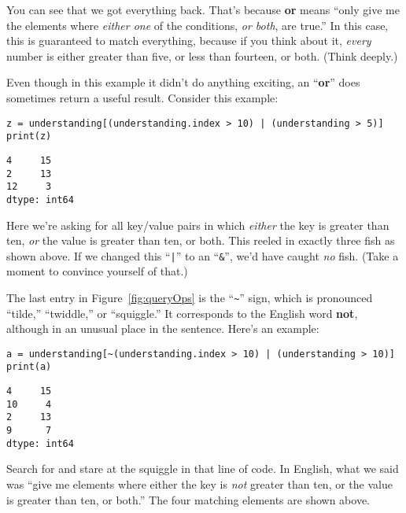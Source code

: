 You can see that we got everything back. That's because \textbf{or} means
``only give me the elements where \textit{either one} of the conditions,
\textit{or both}, are true.'' In this case, this is guaranteed to match
everything, because if you think about it, \textit{every} number is either
greater than five, or less than fourteen, or both. (Think deeply.)

Even though in this example it didn't do anything exciting, an ``\textbf{or}''
does sometimes return a useful result. Consider this example:

\begin{Verbatim}[fontsize=\scriptsize,samepage=true,frame=single,framesep=3mm]
z = understanding[(understanding.index > 10) | (understanding > 5)]
print(z)
\end{Verbatim}

\begin{Verbatim}[fontsize=\small,samepage=true,frame=leftline,framesep=5mm,framerule=1mm]
4     15
2     13
12     3
dtype: int64
\end{Verbatim}

Here we're asking for all key/value pairs in which \textit{either} the key is
greater than ten, \textit{or} the value is greater than ten, or both. This
reeled in exactly three fish as shown above. If we changed this ``\texttt{|}''
to an ``\texttt{\&}'', we'd have caught \textit{no} fish. (Take a moment to
convince yourself of that.)


The last entry in Figure~\ref{fig:queryOps} is the ``\texttt{\textasciitilde}''
sign, which is pronounced ``tilde,'' ``twiddle,'' or ``squiggle.'' It
corresponds to the English word \textbf{not}, although in an unusual place in
the sentence. Here's an example:

\begin{Verbatim}[fontsize=\scriptsize,samepage=true,frame=single,framesep=3mm]
a = understanding[~(understanding.index > 10) | (understanding > 10)]
print(a)
\end{Verbatim}

\begin{Verbatim}[fontsize=\small,samepage=true,frame=leftline,framesep=5mm,framerule=1mm]
4     15
10     4
2     13
9      7
dtype: int64
\end{Verbatim}

Search for and stare at the squiggle in that line of code. In English, what we
said was ``give me elements where either the key is \textit{not} greater than
ten, or the value is greater than ten, or both.'' The four matching elements
are shown above. 

